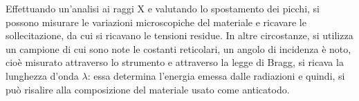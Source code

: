Effettuando un’analisi ai raggi X e valutando lo spostamento dei picchi, si possono misurare le variazioni microscopiche del materiale e ricavare le sollecitazione, da cui si ricavano le tensioni residue.
In altre circostanze, si utilizza un campione di cui sono note le costanti reticolari, un angolo di incidenza è noto, cioè misurato attraverso lo strumento e attraverso la legge di Bragg, si ricava la lunghezza d’onda $\lambda$: essa determina l’energia emessa dalle radiazioni e quindi, si può risalire alla composizione del materiale usato come anticatodo.